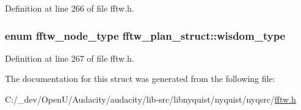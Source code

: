 Definition at line 266 of file fftw.\+h.

\subsubsection[{\texorpdfstring{wisdom\+\_\+type}{wisdom_type}}]{\setlength{\rightskip}{0pt plus 5cm}enum {\bf fftw\+\_\+node\+\_\+type} fftw\+\_\+plan\+\_\+struct\+::wisdom\+\_\+type}\hypertarget{structfftw__plan__struct_ab5226ce275144b46887c740ab90b79dd}{}\label{structfftw__plan__struct_ab5226ce275144b46887c740ab90b79dd}


Definition at line 267 of file fftw.\+h.



The documentation for this struct was generated from the following file\+:\begin{DoxyCompactItemize}
\item 
C\+:/\+\_\+dev/\+Open\+U/\+Audacity/audacity/lib-\/src/libnyquist/nyquist/nyqsrc/\hyperlink{fftw_8h}{fftw.\+h}\end{DoxyCompactItemize}
